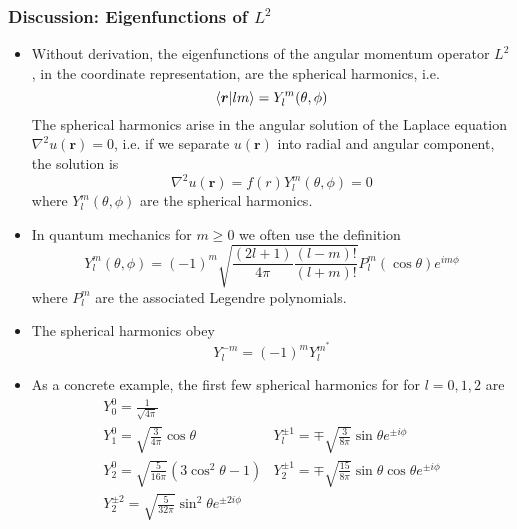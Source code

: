 \documentclass[11pt, a4paper]{article}
\renewcommand{\laplacian}{\nabla^{2}}
\renewcommand{\vec}[1]{\bm{#1}}  %
\renewcommand{\r}{\vec{r}}  %
\begin{document}
\subsubsection{Discussion: Eigenfunctions of $ L^{2} $}
\begin{itemize}
	\item Without derivation, the eigenfunctions of the angular momentum operator $ L^{2} $, in the coordinate representation, are the spherical harmonics, i.e.
	\begin{equation*}
		\braket{\r}{lm} = Y_{l}^{m}(\theta, \phi) 
	\end{equation*}
	The spherical harmonics arise in the angular solution of the Laplace equation $ \laplacian u(\r) = 0 $, i.e. if we separate $ u(\r) $ into radial and angular component, the solution is
	\begin{equation*}
		\laplacian u(\r) = f(r)Y_{l}^{m}(\theta, \phi) = 0
	\end{equation*}
	where $ Y_{l}^{m}(\theta, \phi)  $ are the spherical harmonics. 
	
	\item In quantum mechanics for $ m \geq 0  $ we often use the definition
	\begin{equation*}
		Y_{l}^{m}(\theta, \phi) = (-1)^{m}\sqrt{\frac{(2l+1)}{4\pi}\frac{(l-m)!}{(l+m)!}} P_{l}^{m}(\cos \theta)e^{im\phi}
	\end{equation*}
	where $ P_{l}^{m} $ are the associated Legendre polynomials.
	
	\item The spherical harmonics obey 
	\begin{equation*}
		Y_{l}^{-m} = (-1)^{m}Y_{l}^{m^{*}}
	\end{equation*}
	
	\item As a concrete example, the first few spherical harmonics for for $ l = 0, 1, 2 $ are
	\[
		\begin{array}{ll}
			Y_{0}^{0} = \frac{1}{\sqrt{4\pi}} &\\
			Y_{1}^{0} = \sqrt{\frac{3}{4\pi}}\cos \theta & Y_{l}^{\pm 1} = \mp \sqrt{\frac{3}{8\pi}}\sin \theta e^{\pm i \phi}\\
			Y_{2}^{0} = \sqrt{\frac{5}{16\pi}}  (3\cos^{2}\theta - 1) & Y_{2}^{\pm 1} = \mp \sqrt{\frac{15}{8\pi}}\sin \theta \cos \theta e^{\pm i \phi}\\
			Y_{2}^{\pm 2} = \sqrt{\frac{5}{32\pi}}\sin^{2}\theta e^{\pm 2i \phi}
		\end{array}
	\]
\end{itemize}
\end{document}
